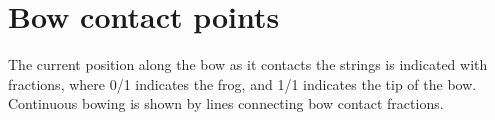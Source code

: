 \section{Bow contact points}

The current position along the bow as it contacts the strings is indicated
with fractions, where 0/1 indicates the frog, and 1/1 indicates the tip of
the bow. Continuous bowing is shown by lines connecting bow contact
fractions.
